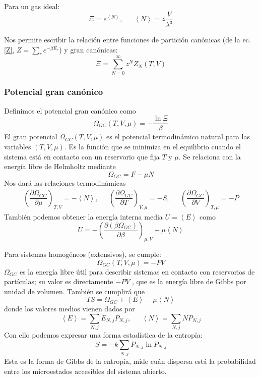 \documentclass[]{article}
\numberwithin{equation}{section}
\newcommand{\dderiv}[3]{\left(\dfrac{\partial #1}{\partial #2} \right)_{#3}}
\newcommand{\0}{\textcolor{gray}{0}}
\newcommand{\pr}[1]{\left\langle #1 \right\rangle }
\begin{document}
Para un gas ideal:
\begin{equation}
	\Xi = e^{\pr{N}}, ~~~~~~~ \pr{N} = z \frac{V}{\lambda^3}
\end{equation}

Nos permite escribir la relación entre funciones de partición canónicas (de la ec. \ref{Z}, \(Z = \sum_{r} e^{-\beta E_r}\)) y gran canónicas:
\begin{equation}
	\Xi = \sum_{N=0}^{\infty} z^N Z_N (T,V)
\end{equation}

\subsubsection{Potencial gran canónico}
Definimos el potencial gran canónico como
\begin{equation}
	\Omega_{GC} (T,V,\mu) = - \frac{\ln\Xi}{\beta}
\end{equation}
El gran potencial \(\Omega_{GC} (T,V,\mu)\) es el potencial termodinámico natural para las variables \((T,V,\mu)\). Es la función que se minimiza en el equilibrio cuando el sistema está en contacto con un reservorio que fija \(T\) y \(\mu\). Se relaciona con la energía libre de Helmholtz mediante
\begin{equation}
	\Omega_{GC} = F - \mu N
\end{equation}
Nos dará las relaciones termodinámicas
\begin{equation}
	\begin{matrix}
		\dderiv{\Omega_{GC}}{\mu}{T,V} = -\pr{N},\ \ \ & \dderiv{\Omega_{GC}}{T}{V,\mu} = -S,\ \ \ & \dderiv{\Omega_{GC}}{V}{T,\mu} = -P
	\end{matrix}
\end{equation}
También podemos obtener la energía interna media \(U = \left\langle E \right\rangle \) como
\begin{equation}
	U = - \dderiv{(\beta \Omega_{GC})}{\beta}{\mu, V} + \mu \left\langle N \right\rangle
\end{equation}

Para sistemas homogéneos (extensivos), se cumple:
\begin{equation}
	\Omega_{GC} (T,V,\mu) = - P V
\end{equation}
\(\Omega_{GC}\) es la energía libre útil para describir sistemas en contacto con reservorios de partículas; su valor es directamente \(- P V\) , que es la energía libre de Gibbs por unidad de volumen. También se cumplirá que
\begin{equation}
	T S = \Omega_{GC} + \left\langle  E \right\rangle - \mu \pr{N}
\end{equation}
donde los valores medios vienen dados por
\begin{equation}
	\left\langle  E \right\rangle = \sum_{N,j} E_{N,j} P_{N,j}, ~~~~~~~ \left\langle N \right\rangle = \sum_{N,j} N P_{N,j}
\end{equation}
Con ello podemos expresar una forma estadística de la entropía:
\begin{equation}
	S = -k \sum_{N,j} P_{N,j} \ln P_{N,j}
\end{equation}
Esta es la forma de Gibbs de la entropía, mide cuán dispersa está la probabilidad entre los
microestados accesibles del sistema abierto.
\end{document}
